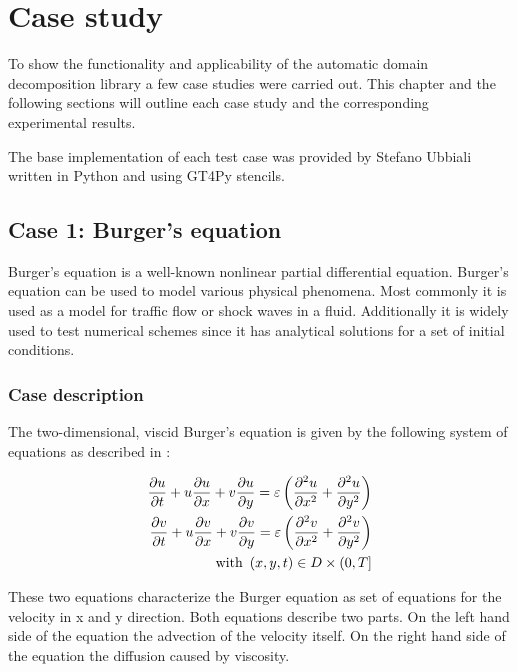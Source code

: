 \section{Case study}

To show the functionality and applicability of the automatic domain decomposition library a few case studies were carried out.
This chapter and the following sections will outline each case study and the corresponding experimental results.

The base implementation of each test case was provided by Stefano Ubbiali written in Python and using GT4Py stencils.

\subsection{Case 1: Burger's equation}
Burger's equation is a well-known nonlinear partial differential equation.
Burger's equation can be used to model various physical phenomena.
Most commonly it is used as a model for traffic flow or shock waves in a fluid.
Additionally it is widely used to test numerical schemes since it has analytical solutions for a set of initial conditions.

\subsubsection{Case description}

The two-dimensional, viscid Burger's equation is given by the following system of equations as described in \citet{zhao2011new}:

\begin{equation}
\begin{split}
\frac{\partial u}{\partial t} + u \frac{\partial u}{\partial x} + v \frac{\partial u}{\partial y} = \varepsilon \left( \frac{\partial ^2 u}{\partial x^2} + \frac{\partial ^2 u}{\partial y^2} \right) \\
\frac{\partial v}{\partial t} + u \frac{\partial v}{\partial x} + v \frac{\partial v}{\partial y} = \varepsilon \left( \frac{\partial ^2 v}{\partial x^2} + \frac{\partial ^2 v}{\partial y^2} \right) \\
\text{with } \left(x, y, t\right) \in D \times \left(0,T\right]
\end{split}
\end{equation}

These two equations characterize the Burger equation as set of equations for the velocity in x and y direction.
Both equations describe two parts.
On the left hand side of the equation the advection of the velocity itself.
On the right hand side of the equation the diffusion caused by viscosity.

